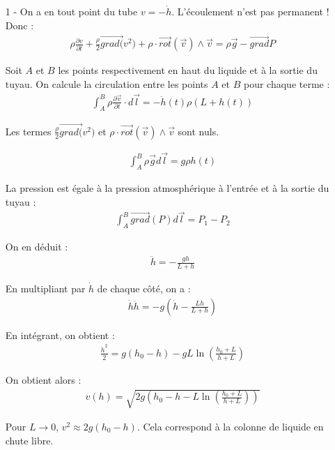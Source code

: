 \documentclass{report}
\begin{document}
\begin{itemize}

	\item[1 - ] On a en tout point du tube $v=-\dot{h}$. L'écoulement n'est pas permanent ! Donc :
	\begin{align*}
		\rho\frac{\partial v}{\partial t} +\frac{\rho}{2}\vec{grad(}v^2)+\rho\cdot \vec{rot}(\vec{v})\wedge\vec{v} =\rho\vec{g}-\vec{grad}P
	\end{align*}

Soit $A$ et $B$ les points respectivement en haut du liquide et à la sortie du tuyau. On calcule la circulation entre les points $A$ et $B$ pour chaque terme :
\begin{align*}
	\int_A^B\rho\frac{\partial \vec{v}}{\partial t}\cdot d\vec{l}=-\ddot{h}(t)\rho(L+h(t))
\end{align*}

Les termes $\frac{\rho}{2}\vec{grad(}v^2)$ et $\rho\cdot \vec{rot}(\vec{v})\wedge\vec{v}$ sont nuls. 

\begin{align*}
	\int_A^B\rho\vec{g}d\vec{l}=g\rho h(t)
\end{align*}

La pression est égale à la pression atmosphérique à l'entrée et à la sortie du tuyau :
\begin{align*}
	\int_A^B\vec{grad}(P)d\vec{l}=P_1-P_2
\end{align*}

On en déduit :
\begin{align*}
	\ddot{h}=-\frac{gh}{L+h}
\end{align*}

En multipliant par $\dot{h}$ de chaque côté, on a :
\begin{align*}
	\dot{h}\ddot{h}=-g\left(\dot{h} - \frac{L\dot{h}}{L+h}\right) 
\end{align*}

En intégrant, on obtient : 
\begin{align*}
	\frac{\dot{h}^2}{2}=g(h_0-h)-gL\ln\left(\frac{h_0+L}{h+L} \right) 
\end{align*}

On obtient alors :
\begin{align*}
	v(h)=\sqrt{2g\left( h_0-h-L\ln\left(\frac{h_0+L}{h+L}  \right)\right)  }
\end{align*}

Pour $L\longrightarrow0$, $v^2\approx2g(h_0-h)$. Cela correspond à la colonne de liquide en chute libre.


\end{itemize}
\end{document}
